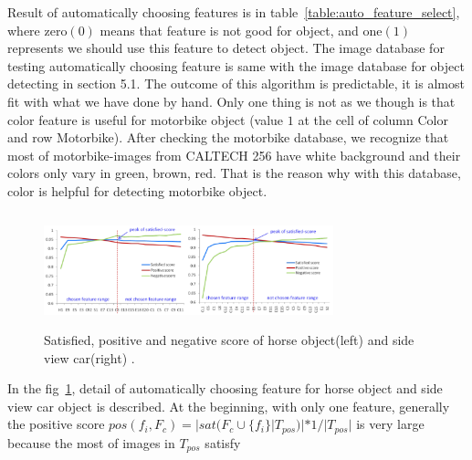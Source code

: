 Result of automatically choosing features is in table~\ref{table:auto_feature_select}, where
zero$(0)$ means that feature is not good for object, and one$(1)$
represents we should use this feature to detect object. The image
database for testing automatically choosing feature is same with the
image database for object detecting in section 5.1. The outcome of
this algorithm is predictable, it is almost fit with what we have done
by hand. Only one thing is not as we though is that color feature is
useful for motorbike object (value $1$ at the cell of column Color and
row Motorbike). After checking the motorbike database, we
recognize that most of motorbike-images from CALTECH 256 have
white background and their colors only vary in green, brown, red.
That is the reason why with this database, color is helpful for
detecting motorbike object.
\begin{figure}[ht]
  \centering
  \includegraphics[width=3.3in,height=1.3in]{images/auto_selection.pdf}
  \caption{Satisfied, positive and negative score of horse object(left) and side view car(right) .}
  \label{fig:auto_selection}
\end{figure}
In the fig~\ref{fig:auto_selection}, detail of automatically choosing feature for
horse object and side view car object is described. 
At the beginning, with only one feature, generally the positive score $ pos(f_i,F_c) = |sat(F_c \cup \{f_i\}|T_{pos})| * 1/|T_{pos}|$  is very large because the most of images in $T_{pos}$ satisfy
